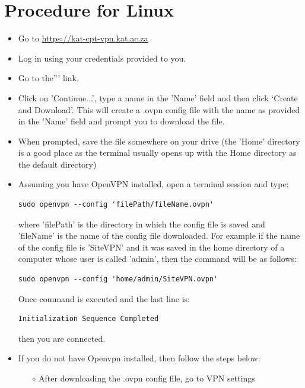 
\section{Procedure for Linux}

\begin{itemize}
	
\item Go to \url{https://kat-cpt-vpn.kat.ac.za}
\item Log in using your credentials provided to you.
\item Go to the''' link.
\item Click on 'Continue...', type a name in the 'Name' field and then click ‘Create and Download’. This will create a .ovpn config file with the name as provided in the 'Name' field and prompt you to download the file.
\item When prompted, save the file somewhere on your drive (the 'Home' directory is a good place as the terminal usually opens up with the Home directory as the default directory)
\item Assuming you have OpenVPN installed, open a terminal session and type:
\begin{lstlisting}[style=DOS]
sudo openvpn --config 'filePath/fileName.ovpn'
\end{lstlisting}

	where 'filePath' is the directory in which the config file is saved and 'fileName' is the       name of the config file downloaded. For example if the name of the config file is 'SiteVPN' and it was saved in the home directory of a computer whose user is called 'admin', then the command will be as follows:
\begin{lstlisting}[style=DOS]
sudo openvpn --config 'home/admin/SiteVPN.ovpn'
\end{lstlisting}

Once command is executed and the last line is:
\begin{lstlisting}[style=DOS]
Initialization Sequence Completed
\end{lstlisting}

	then you are connected.
\item If you do not have Openvpn installed, then follow the steps below:
\begin{itemize}
\item[$\circ$] After downloading the .ovpn config file, go to VPN settings


\end{itemize}
\end{itemize}
